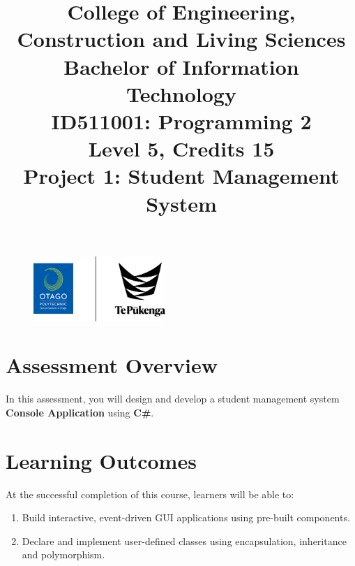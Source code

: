 \documentclass{article}
\author{}
\begin{document}
\begin{figure}
    \centering
    \includegraphics[width=50mm]{../../resources/img/logo.png}
\end{figure}

\title{College of Engineering, Construction and Living Sciences\\Bachelor of Information Technology\\ID511001: Programming 2\\Level 5, Credits 15\\\textbf{Project 1: Student Management System}}
\date{}
\maketitle

\section*{Assessment Overview}
In this assessment, you will design and develop a student management system \textbf{Console Application} using \textbf{C\#}. 

\section*{Learning Outcomes}
At the successful completion of this course, learners will be able to:
\begin{enumerate}
    \item Build interactive, event-driven GUI applications using pre-built components.
    \item Declare and implement user-defined classes using encapsulation, inheritance and polymorphism.
\end{enumerate}
\end{document}
